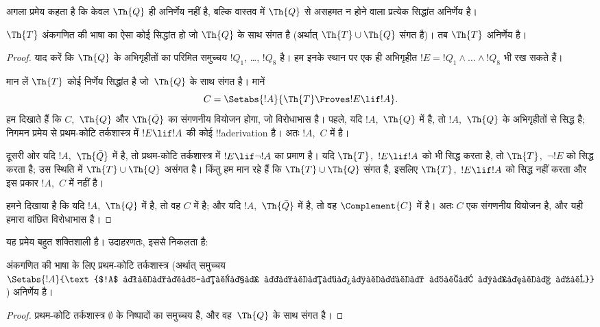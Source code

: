 \documentclass[../../../include/open-logic-section]{subfiles}
\begin{document}


अगला प्रमेय कहता है कि केवल $\Th{Q}$ ही अनिर्णेय नहीं है, बल्कि वास्तव में
$\Th{Q}$ से असहमत न होने वाला प्रत्येक सिद्धांत अनिर्णेय है।

\begin{thm}
$\Th{T}$ अंकगणित की भाषा का ऐसा कोई सिद्धांत हो जो $\Th{Q}$ के साथ संगत
है (अर्थात् $\Th{T} \cup \Th{Q}$ संगत है)। तब $\Th{T}$ अनिर्णेय है।
\end{thm}

\begin{proof}
याद करें कि $\Th{Q}$ के अभिगृहीतों का परिमित समुच्चय $!Q_1$, \dots,
$!Q_8$ है। हम इनके स्थान पर एक ही अभिगृहीत
$!E = !Q_1 \land \dots \land !Q_8$ भी रख सकते हैं।

मान लें $\Th{T}$ कोई निर्णेय सिद्धांत है जो~$\Th{Q}$ के साथ संगत है। मानें
\[
C = \Setabs{!A}{\Th{T} \Proves !E \lif !A}.
\]
हम दिखाते हैं कि $C$,~$\Th{Q}$ और $\Th{\bar Q}$ का संगणनीय वियोजन होगा,
जो विरोधाभास है। पहले, यदि $!A$,~$\Th{Q}$ में है, तो $!A$,~$\Th{Q}$ के
अभिगृहीतों से सिद्ध है; निगमन प्रमेय से प्रथम-कोटि तर्कशास्त्र में
$!E \lif !A$ की कोई !!a{derivation} है। अतः $!A$,~$C$ में है।

दूसरी ओर यदि $!A$,~$\Th{\bar Q}$ में है, तो प्रथम-कोटि तर्कशास्त्र में
$!E \lif \lnot !A$ का प्रमाण है। यदि $\Th{T}$,~$!E \lif !A$ को भी सिद्ध
करता है, तो $\Th{T}$,~$\lnot !E$ को सिद्ध करता है; उस स्थिति में
$\Th{T} \cup \Th{Q}$ असंगत है। किंतु हम मान रहे हैं कि
$\Th{T} \cup \Th{Q}$ संगत है, इसलिए $\Th{T}$,~$!E \lif !A$ को सिद्ध
नहीं करता और इस प्रकार $!A$,~$C$ में नहीं है।

हमने दिखाया है कि यदि $!A$,~$\Th{Q}$ में है, तो वह $C$ में है; और यदि
$!A$,~$\Th{\bar Q}$ में है, तो वह $\Complement{C}$ में है। अतः $C$ एक
संगणनीय वियोजन है, और यही हमारा वांछित विरोधाभास है।
\end{proof}

यह प्रमेय बहुत शक्तिशाली है। उदाहरणतः, इससे निकलता है:

\begin{cor}
  अंकगणित की भाषा के लिए प्रथम-कोटि तर्कशास्त्र (अर्थात् समुच्चय
  $\Setabs{!A}{\text{$!A$ प्रथम-कोटि तर्कशास्त्र में सिद्ध है}}$)
  अनिर्णेय है।
\end{cor}

\begin{proof}
प्रथम-कोटि तर्कशास्त्र $\emptyset$ के निष्पादों का समुच्चय है, और
वह~$\Th{Q}$ के साथ संगत है।
\end{proof}
\end{document}
